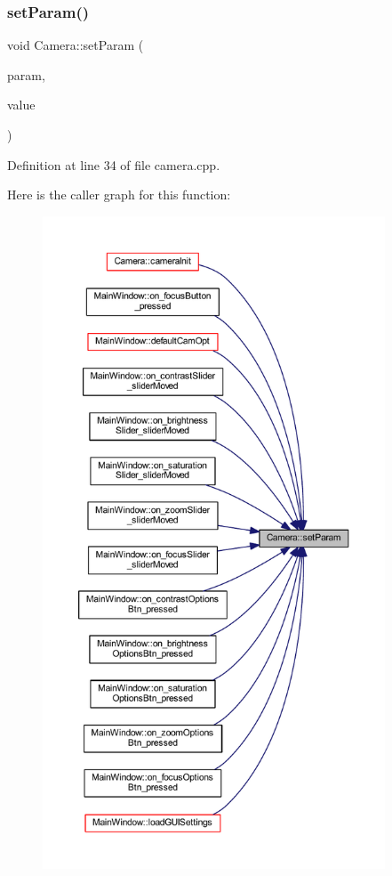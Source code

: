 \subsubsection{\texorpdfstring{setParam()}{setParam()}}
{\footnotesize\ttfamily void Camera\+::set\+Param (\begin{DoxyParamCaption}\item[{Video\+Capture\+Properties}]{param,  }\item[{int}]{value }\end{DoxyParamCaption})}



Definition at line 34 of file camera.\+cpp.

Here is the caller graph for this function\+:
\nopagebreak
\begin{figure}[H]
\begin{center}
\leavevmode
\includegraphics[height=550pt]{classCamera_a9c9ba5d6bed27bdd033ea40280741cf9_icgraph}
\end{center}
\end{figure}



